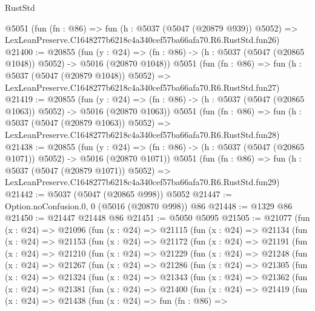 \begin{lexlean}{RustStd}
\begin{coremodule}
    @5051
    (fun (fn : @86) =>
    fun (h : @5037 (@5047 (@20879 @939)) @5052) =>
    LexLeanPreserve.C1648277b6218c4a340cef57ba66afa70.R6.RustStd.fun26)
@21400 := @20855
    (fun (y : @24) =>
    (fn : @86) -> (h : @5037 (@5047 (@20865 @1048)) @5052) -> @5016 (@20870 @1048))
    @5051
    (fun (fn : @86) =>
    fun (h : @5037 (@5047 (@20879 @1048)) @5052) =>
    LexLeanPreserve.C1648277b6218c4a340cef57ba66afa70.R6.RustStd.fun27)
@21419 := @20855
    (fun (y : @24) =>
    (fn : @86) -> (h : @5037 (@5047 (@20865 @1063)) @5052) -> @5016 (@20870 @1063))
    @5051
    (fun (fn : @86) =>
    fun (h : @5037 (@5047 (@20879 @1063)) @5052) =>
    LexLeanPreserve.C1648277b6218c4a340cef57ba66afa70.R6.RustStd.fun28)
@21438 := @20855
    (fun (y : @24) =>
    (fn : @86) -> (h : @5037 (@5047 (@20865 @1071)) @5052) -> @5016 (@20870 @1071))
    @5051
    (fun (fn : @86) =>
    fun (h : @5037 (@5047 (@20879 @1071)) @5052) =>
    LexLeanPreserve.C1648277b6218c4a340cef57ba66afa70.R6.RustStd.fun29)
@21442 := @5037 (@5047 (@20865 @998)) @5052
@21447 := Option.noConfusion.{0, 0} (@5016 (@20870 @998)) @86
@21448 := @1329 @86
@21450 := @21447 @21448 @86
@21451 := @5050 @5095
@21505 := @21077
    (fun (x : @24) =>
    @21096
      (fun (x : @24) =>
      @21115
        (fun (x : @24) =>
        @21134
          (fun (x : @24) =>
          @21153
            (fun (x : @24) =>
            @21172
              (fun (x : @24) =>
              @21191
                (fun (x : @24) =>
                @21210
                  (fun (x : @24) =>
                  @21229
                    (fun (x : @24) =>
                    @21248
                      (fun (x : @24) =>
                      @21267
                        (fun (x : @24) =>
                        @21286
                          (fun (x : @24) =>
                          @21305
                            (fun (x : @24) =>
                            @21324
                              (fun (x : @24) =>
                              @21343
                                (fun (x : @24) =>
                                @21362
                                  (fun (x : @24) =>
                                  @21381
                                    (fun (x : @24) =>
                                    @21400
                                      (fun (x : @24) =>
                                      @21419
                                        (fun (x : @24) =>
                                        @21438
                                          (fun (x : @24) =>
                                          fun (fn : @86) =>

\end{coremodule}
\end{lexlean}
